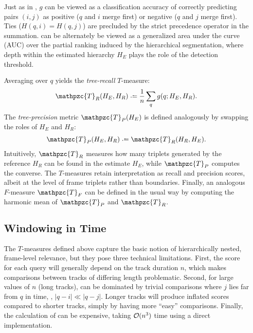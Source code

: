 \documentclass{article}
\def\shag{\ensuremath{\mathpzc{T}}}
\begin{document}
Just as in , $g$ can be viewed as a classification accuracy of correctly predicting pairs $(i, j)$ as positive ($q$ and $i$ merge first) or negative ($q$ and $j$ merge first).
Ties ($H(q, i) = H(q, j)$) are precluded by the strict precedence operator in the summation.
 can be alternately be viewed as a generalized area under the curve (AUC) over the partial
ranking induced by the hierarchical segmentation, where depth within the estimated hierarchy $H_E$ plays the
role of the detection threshold.

Averaging over $q$ yields the \emph{tree-recall} $T$-measure:
\begin{equation}
\shag_R(H_E, H_R) \defeq \frac{1}{n} \sum_q g(q ; H_E, H_R).\label{shagunder}
\end{equation}
The \emph{tree-precision} metric $\shag_P(H_E)$ is defined analogously by swapping the roles of $H_E$ and $H_R$:
\begin{equation}
\shag_P(H_E, H_R) \defeq \shag_R(H_R, H_E).
\end{equation}
Intuitively, $\shag_R$ measures how many triplets generated by the reference $H_R$ can be found in the estimate $H_E$, 
while $\shag_P$ computes the converse.  The $T$-measures retain interpretation as recall and precision scores,
albeit at the level of frame triplets rather than boundaries.  Finally, an analogous $F$-measure $\shag_F$ can 
be defined in the usual way by computing the harmonic mean of $\shag_P$ and $\shag_R$.


\subsection{Windowing in Time}
\label{sec:window}

The $T$-measures defined above capture the basic notion of hierarchically nested, frame-level relevance, but
they pose three technical limitations.
First, the score for each query will generally depend on the track duration $n$, which makes comparisons between tracks of differing length problematic.  
Second, for large values of $n$ (long tracks),  can be dominated by trivial comparisons
where $j$ lies far from $q$ in time, \ie, $|q-i| \ll |q-j|$.
Longer tracks will produce inflated scores compared to shorter tracks, simply by having more ``easy'' comparisons.
Finally, the calculation of  can be expensive, taking
$\mathcal{O}(n^3)$ time using a direct implementation.
\end{document}
